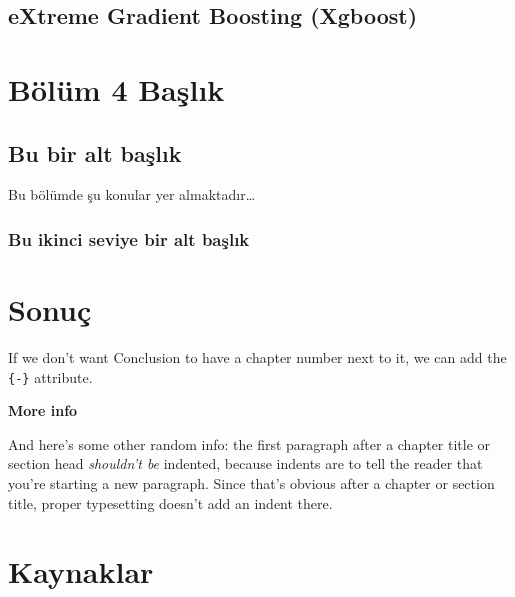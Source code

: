 \documentclass[12pt,twoside]{deuthesis}
\begin{document}
\hypertarget{extreme-gradient-boosting-xgboost}{%
\section{eXtreme Gradient Boosting (Xgboost)}\label{extreme-gradient-boosting-xgboost}}

\hypertarget{Bolum4}{%
\chapter{Bölüm 4 Başlık}\label{Bolum4}}

\hypertarget{bu-bir-alt-baux15flux131k}{%
\section{Bu bir alt başlık}\label{bu-bir-alt-baux15flux131k}}

Bu bölümde şu konular yer almaktadır\ldots{}

\hypertarget{bu-ikinci-seviye-bir-alt-baux15flux131k}{%
\subsection{Bu ikinci seviye bir alt başlık}\label{bu-ikinci-seviye-bir-alt-baux15flux131k}}

\hypertarget{sonuuxe7}{%
\chapter*{Sonuç}\label{sonuuxe7}}

If we don't want Conclusion to have a chapter number next to it, we can add the \texttt{\{-\}} attribute.

\textbf{More info}

And here's some other random info: the first paragraph after a chapter title or section head \emph{shouldn't be} indented, because indents are to tell the reader that you're starting a new paragraph. Since that's obvious after a chapter or section title, proper typesetting doesn't add an indent there.

\hypertarget{kaynaklar}{%
\chapter*{Kaynaklar}\label{kaynaklar}}

\end{document}
